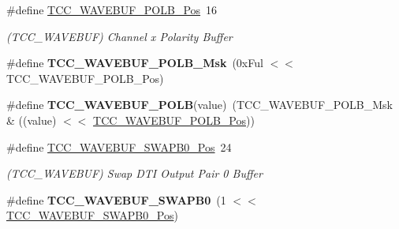 \begin{DoxyCompactItemize}
\item 
\hypertarget{group___s_a_m_l21___t_c_c_ga41b238d386249d4a068de8adade333f7}{}\#define \hyperlink{group___s_a_m_l21___t_c_c_ga41b238d386249d4a068de8adade333f7}{T\+C\+C\+\_\+\+W\+A\+V\+E\+B\+U\+F\+\_\+\+P\+O\+L\+B\+\_\+\+Pos}~16\label{group___s_a_m_l21___t_c_c_ga41b238d386249d4a068de8adade333f7}

\begin{DoxyCompactList}\small\item\em (T\+C\+C\+\_\+\+W\+A\+V\+E\+B\+U\+F) Channel x Polarity Buffer \end{DoxyCompactList}\item 
\hypertarget{group___s_a_m_l21___t_c_c_ga8247c167a2953bb078f1f933096c3c1d}{}\#define {\bfseries T\+C\+C\+\_\+\+W\+A\+V\+E\+B\+U\+F\+\_\+\+P\+O\+L\+B\+\_\+\+Msk}~(0x\+Ful $<$$<$ T\+C\+C\+\_\+\+W\+A\+V\+E\+B\+U\+F\+\_\+\+P\+O\+L\+B\+\_\+\+Pos)\label{group___s_a_m_l21___t_c_c_ga8247c167a2953bb078f1f933096c3c1d}

\item 
\hypertarget{group___s_a_m_l21___t_c_c_ga8b78a3364bf31bc6828af47c74955d45}{}\#define {\bfseries T\+C\+C\+\_\+\+W\+A\+V\+E\+B\+U\+F\+\_\+\+P\+O\+L\+B}(value)~(T\+C\+C\+\_\+\+W\+A\+V\+E\+B\+U\+F\+\_\+\+P\+O\+L\+B\+\_\+\+Msk \& ((value) $<$$<$ \hyperlink{group___s_a_m_l21___t_c_c_ga41b238d386249d4a068de8adade333f7}{T\+C\+C\+\_\+\+W\+A\+V\+E\+B\+U\+F\+\_\+\+P\+O\+L\+B\+\_\+\+Pos}))\label{group___s_a_m_l21___t_c_c_ga8b78a3364bf31bc6828af47c74955d45}

\item 
\hypertarget{group___s_a_m_l21___t_c_c_ga9dfaa6fe4d445eb813415120a4117af8}{}\#define \hyperlink{group___s_a_m_l21___t_c_c_ga9dfaa6fe4d445eb813415120a4117af8}{T\+C\+C\+\_\+\+W\+A\+V\+E\+B\+U\+F\+\_\+\+S\+W\+A\+P\+B0\+\_\+\+Pos}~24\label{group___s_a_m_l21___t_c_c_ga9dfaa6fe4d445eb813415120a4117af8}

\begin{DoxyCompactList}\small\item\em (T\+C\+C\+\_\+\+W\+A\+V\+E\+B\+U\+F) Swap D\+T\+I Output Pair 0 Buffer \end{DoxyCompactList}\item 
\hypertarget{group___s_a_m_l21___t_c_c_gab62ac5e8f8a72d441e69a38afab9f7ef}{}\#define {\bfseries T\+C\+C\+\_\+\+W\+A\+V\+E\+B\+U\+F\+\_\+\+S\+W\+A\+P\+B0}~(1 $<$$<$ \hyperlink{group___s_a_m_l21___t_c_c_ga9dfaa6fe4d445eb813415120a4117af8}{T\+C\+C\+\_\+\+W\+A\+V\+E\+B\+U\+F\+\_\+\+S\+W\+A\+P\+B0\+\_\+\+Pos})\label{group___s_a_m_l21___t_c_c_gab62ac5e8f8a72d441e69a38afab9f7ef}


\end{DoxyCompactItemize}
